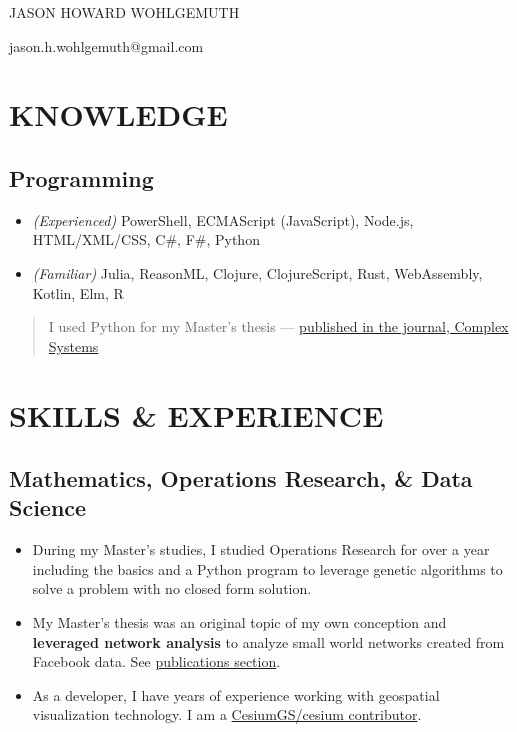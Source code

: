\documentclass[10pt]{article}
\def\tightlist{}
\begin{document}
\begin{center}\Huge {JASON HOWARD WOHLGEMUTH}\end{center}
\begin{center}jason.h.wohlgemuth@gmail.com\end{center}

\hypertarget{knowledge}{%
\section{KNOWLEDGE}\label{knowledge}}

\hypertarget{programming}{%
\subsection{Programming}\label{programming}}

\begin{itemize}
\tightlist
\item
  \emph{(Experienced)} PowerShell, ECMAScript (JavaScript), Node.js,
  HTML/XML/CSS, C\#, F\#, Python
\item
  \emph{(Familiar)} Julia, ReasonML, Clojure, ClojureScript, Rust,
  WebAssembly, Kotlin, Elm, R
\end{itemize}

\begin{quote}
I used Python for my Master's thesis ---
\href{https://www.complex-systems.com/abstracts/v23_i03_a01/}{published
in the journal, Complex Systems}
\end{quote}

\hypertarget{skills-experience}{%
\section{SKILLS \& EXPERIENCE}\label{skills-experience}}

\hypertarget{mathematics-operations-research-data-science}{%
\subsection{Mathematics, Operations Research, \& Data
Science}\label{mathematics-operations-research-data-science}}

\begin{itemize}
\tightlist
\item
  During my Master's studies, I studied Operations Research for over a
  year including the basics and a Python program to leverage genetic
  algorithms to solve a problem with no closed form solution.
\item
  My Master's thesis was an original topic of my own conception and
  \textbf{leveraged network analysis} to analyze small world networks
  created from Facebook data. See
  \protect\hyperlink{publications-citations}{publications section}.
\item
  As a developer, I have years of experience working with geospatial
  visualization technology. I am a
  \href{https://github.com/CesiumGS/cesium/blob/main/CONTRIBUTORS.md}{CesiumGS/cesium
  contributor}.
\end{itemize}
\end{document}
